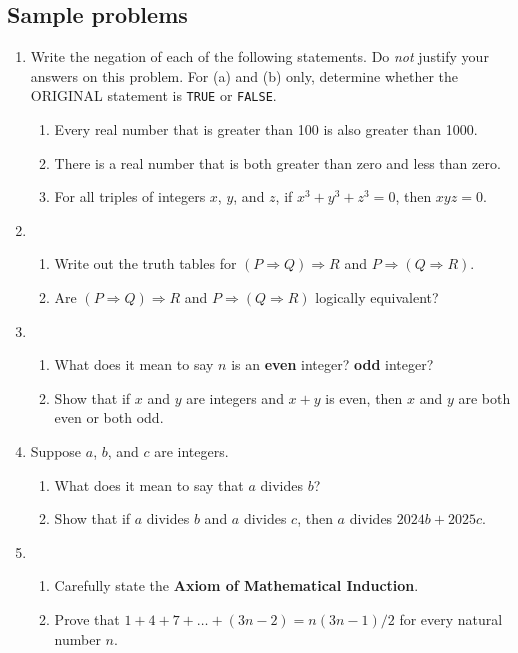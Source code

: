 \documentclass[12pt]{article}
\theoremstyle{plain}
\theoremstyle{remark}
\begin{document}
\newpage

\subsection*{Sample problems}

\begin{enumerate}


\item Write the negation of each of the following statements. Do \emph{not} justify your answers on this problem. For (a) and (b) only, determine whether the ORIGINAL statement is \texttt{TRUE} or \texttt{FALSE}.
\begin{enumerate}
\item Every real number that is greater than 100 is also greater than 1000.
\item There is a real number that is both greater than zero and less than zero.
\item For all triples of integers $x$, $y$, and $z$, if $x^3+y^3+z^3=0$, then $xyz=0$. 
\end{enumerate}

\item 
\begin{enumerate}
\item Write out the truth tables for $(P\Rightarrow Q) \Rightarrow R$ and $P\Rightarrow (Q\Rightarrow R)$. 
\item Are $(P\Rightarrow Q) \Rightarrow R$ and $P\Rightarrow (Q\Rightarrow R)$ logically equivalent?
\end{enumerate}

\item 
\begin{enumerate}
\item What does it mean to say $n$ is an \textbf{even} integer? \textbf{odd} integer?
\item Show that if $x$ and $y$ are integers and $x+y$ is even, then $x$ and $y$ are both even or both odd.
\end{enumerate}

\item Suppose $a$, $b$, and $c$ are integers.
\begin{enumerate}
\item What does it mean to say that $a$ divides $b$?
\item Show that if $a$ divides $b$ and $a$ divides $c$, then $a$ divides $2024b + 2025c$.
\end{enumerate}



\item 
\begin{enumerate}
\item Carefully state the \textbf{Axiom of Mathematical Induction}.
\item Prove that $1 + 4 + 7 + \dots + (3n- 2) = n(3n - 1)/2$ for every natural number $n$.
\end{enumerate}




\end{enumerate}
\end{document}
